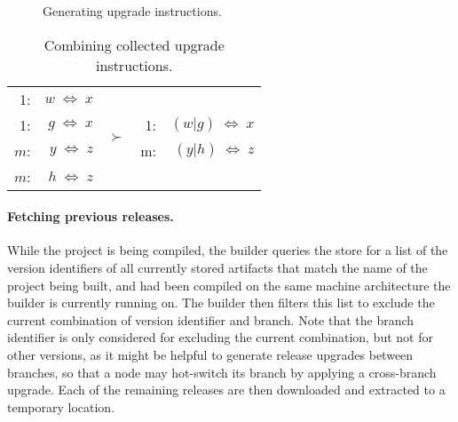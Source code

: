 {\begin{figure}[h]
\begin{subfigure}[b]{\textwidth}
  \end{subfigure}
  \caption{Generating upgrade instructions.}
\end{figure}

\begin{table}[h]
  \setlength{\tabcolsep}{2pt}
  \renewcommand{\arraystretch}{1.5}
  \centering
  \begin{tabular}{ r r c r r }
    1: & $w\;\Leftrightarrow\;{}x$ &
      \multirow{4}{*}{
        \hspace{15pt}
        \Large{$\succ$}
        \hspace{15pt}
      }& \\
    1: & $g\;\Leftrightarrow\;{}x$ & &
      1: & $(w|g)\;\Leftrightarrow\;{}x$ \\
    $m$: & $y\;\Leftrightarrow\;{}z$ & &
      m: & $(y|h)\;\Leftrightarrow\;{}z$ \\
    $m$: & $h\;\Leftrightarrow\;{}z$ & & \\
  \end{tabular}
  \caption{Combining collected upgrade instructions.}\label{table:architectures}
\end{table}


\paragraph{Fetching previous releases.} While the project is being compiled, the builder queries the store for a list of the version identifiers of all currently stored artifacts that match the name of the project being built, and had been compiled on the same machine architecture the builder is currently running on. The builder then filters this list to exclude the current combination of version identifier and branch. Note that the branch identifier is only considered for excluding the current combination, but not for other versions, as it might be helpful to generate release upgrades between branches, so that a node may hot-switch its branch by applying a cross-branch upgrade. Each of the remaining releases are then downloaded and extracted to a temporary location.

}
